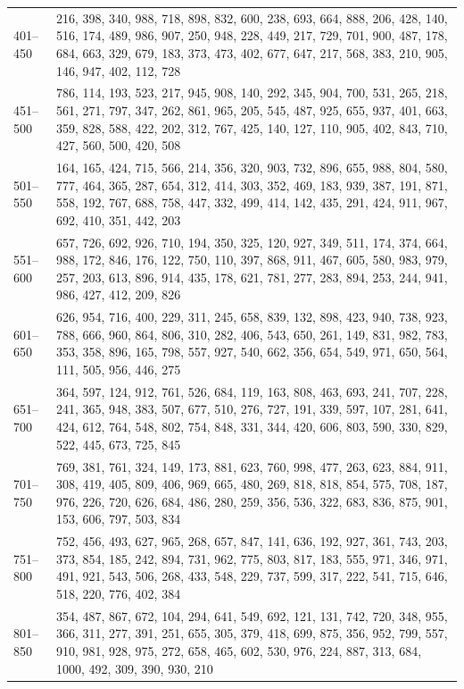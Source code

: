 \documentclass[a4paper, 12pt]{book}
\begin{document}
\begin{table}
\begin{center}
\begin{tabulary}{1.0\textwidth}{p{1.3cm} p{11.58cm}}
      401--450 & 216, 398, 340, 988, 718, 898, 832, 600, 238, 693, 664, 888, 206, 428, 140, 516, 174, 489, 986, 907, 250, 948, 228, 449, 217, 729, 701, 900, 487, 178, 684, 663, 329, 679, 183, 373, 473, 402, 677, 647, 217, 568, 383, 210, 905, 146, 947, 402, 112, 728 \\
      451--500 & 786, 114, 193, 523, 217, 945, 908, 140, 292, 345, 904, 700, 531, 265, 218, 561, 271, 797, 347, 262, 861, 965, 205, 545, 487, 925, 655, 937, 401, 663, 359, 828, 588, 422, 202, 312, 767, 425, 140, 127, 110, 905, 402, 843, 710, 427, 560, 500, 420, 508 \\
      501--550 & 164, 165, 424, 715, 566, 214, 356, 320, 903, 732, 896, 655, 988, 804, 580, 777, 464, 365, 287, 654, 312, 414, 303, 352, 469, 183, 939, 387, 191, 871, 558, 192, 767, 688, 758, 447, 332, 499, 414, 142, 435, 291, 424, 911, 967, 692, 410, 351, 442, 203 \\
      551--600 & 657, 726, 692, 926, 710, 194, 350, 325, 120, 927, 349, 511, 174, 374, 664, 988, 172, 846, 176, 122, 750, 110, 397, 868, 911, 467, 605, 580, 983, 979, 257, 203, 613, 896, 914, 435, 178, 621, 781, 277, 283, 894, 253, 244, 941, 986, 427, 412, 209, 826 \\
      601--650 & 626, 954, 716, 400, 229, 311, 245, 658, 839, 132, 898, 423, 940, 738, 923, 788, 666, 960, 864, 806, 310, 282, 406, 543, 650, 261, 149, 831, 982, 783, 353, 358, 896, 165, 798, 557, 927, 540, 662, 356, 654, 549, 971, 650, 564, 111, 505, 956, 446, 275 \\
      651--700 & 364, 597, 124, 912, 761, 526, 684, 119, 163, 808, 463, 693, 241, 707, 228, 241, 365, 948, 383, 507, 677, 510, 276, 727, 191, 339, 597, 107, 281, 641, 424, 612, 764, 548, 802, 754, 848, 331, 344, 420, 606, 803, 590, 330, 829, 522, 445, 673, 725, 845 \\
      701--750 & 769, 381, 761, 324, 149, 173, 881, 623, 760, 998, 477, 263, 623, 884, 911, 308, 419, 405, 809, 406, 969, 665, 480, 269, 818, 818, 854, 575, 708, 187, 976, 226, 720, 626, 684, 486, 280, 259, 356, 536, 322, 683, 836, 875, 901, 153, 606, 797, 503, 834 \\
      751--800 & 752, 456, 493, 627, 965, 268, 657, 847, 141, 636, 192, 927, 361, 743, 203, 373, 854, 185, 242, 894, 731, 962, 775, 803, 817, 183, 555, 971, 346, 971, 491, 921, 543, 506, 268, 433, 548, 229, 737, 599, 317, 222, 541, 715, 646, 518, 220, 776, 402, 384 \\
      801--850 & 354, 487, 867, 672, 104, 294, 641, 549, 692, 121, 131, 742, 720, 348, 955, 366, 311, 277, 391, 251, 655, 305, 379, 418, 699, 875, 356, 952, 799, 557, 910, 981, 928, 975, 272, 658, 465, 602, 530, 976, 224, 887, 313, 684, 1000, 492, 309, 390, 930, 210 \\

\end{tabulary}
\end{center}
\end{table}
\end{document}
